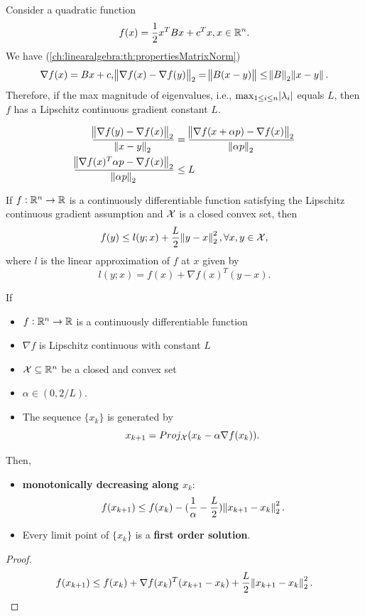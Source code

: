 \begin{refsection}
\begin{example}
Consider a quadratic function $$f(x) = \frac{1}{2}x^TBx + c^Tx, x\in \mathbb{R}^n.$$
We have (\autoref{ch:linearalgebra:th:propertiesMatrixNorm}) 
$$\nabla f(x) = Bx + c, \norm{\nabla f(x) - \nabla f(y)}_2 = \norm{B(x - y)} \leq \norm{B}_2\norm{x-y}.$$
Therefore, if the max magnitude of eigenvalues, i.e., $\max_{1\leq i\leq n} \abs{\lambda_i}$ equals $L$, then $f$ has a Lipschitz continuous gradient constant $L$.
\end{example}


\begin{remark}[interpretation]


\begin{align*}
\frac{\norm{\nabla f(y) - \nabla f(x)}_2}{\norm{x-y}_2} &= \frac{\norm{\nabla f(x+\alpha p) - \nabla f(x)}_2}{\norm{\alpha p}_2} \\
\frac{\norm{\nabla f(x)^T \alpha p - \nabla f(x)}_2}{\norm{\alpha p}_2} & \leq L
\end{align*}

	
\end{remark}

\begin{lemma}\cite[305]{bertsekas2015convex}
If $f:\mathbb{R}^n\to \mathbb{R}$ is a continuously differentiable function satisfying the Lipschitz continuous gradient assumption and $\mathcal{X}$ is a closed convex set, then
$$f(y) \leq l(y;x) + \frac{L}{2}\norm{y-x}_2^2, \forall x,y \in \mathcal{X},$$
where $l$ is the linear approximation of $f$ at $x$ given by
$$l(y;x) = f(x) + \nabla f(x)^T(y - x).$$  
\end{lemma}




\begin{theorem}
If 
\begin{itemize}
	\item $f:\mathbb{R}^n\to \mathbb{R}$ is a continuously differentiable function
	\item $\nabla f$ is Lipschitz continuous with constant $L$
	\item $\mathcal{X} \subseteq \mathbb{R}^n$ be a closed and convex set
	\item $\alpha \in (0,2/L)$.
	\item The sequence $\{x_k\}$ is generated by
	$$x_{k+1} = Proj_{\mathcal{X}}(x_k - \alpha\nabla f(x_k)).$$
\end{itemize}	
Then, 
\begin{itemize}
	\item \textbf{monotonically decreasing along $x_k$}:
	$$f(x_{k+1}) \leq f(x_k) - (\frac{1}{\alpha} - \frac{L}{2})\norm{x_{k+1}-x_k}_2^2.$$
	\item Every limit point of $\{x_k\}$ is a \textbf{first order solution}.
\end{itemize}
\end{theorem}
\begin{proof}
	$$f(x_{k+1}) \leq f(x_k) + \nabla f(x_k)^T(x_{k+1}-x_k) + \frac{L}{2}\norm{x_{k+1}-x_k}_2^2.$$
	

\end{proof}
\end{refsection}
